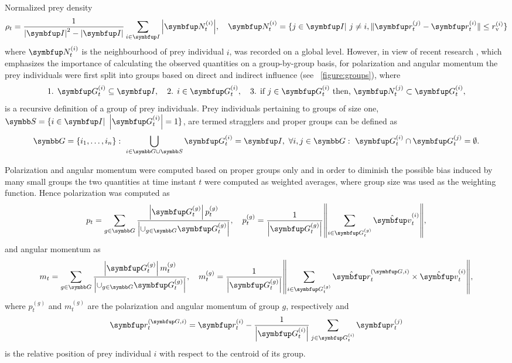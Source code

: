 Normalized prey density
%
\begin{equation}
    \rho_t = \frac{1}{\left|\set{I}\right|^2 - \left|\set{I}\right|} \sum_{i \in \set{I}}{\left|\set{N}^{(i)}_t\right|},\quad \set{N}^{(i)}_t=\{j \in \set{I}|\ j \neq i, \|\vec{r}^{(j)}_t - \vec{r}^{(i)}_t\| \leq r^{(i)}_\textnormal{v}\}
	\label{equation:density}
\end{equation}
%
where $\set{N}^{(i)}_t$ is the neighbourhood of prey individual $i$, was recorded on a global level. However, in view of recent research \cite{viscido2015using}, which emphasizes the importance of calculating the observed quantities on a group-by-group basis, for polarization and angular momentum the prey individuals were first split into groups based on direct and indirect influence (see \figurename~\ref{figure:groups})\cite{lebarbajec2007boids}, where
%
\begin{equation}
\text{1. }\set{G}^{(i)}_t \subseteq \set{I},\quad \text{2. }i \in \set{G}^{(i)}_t,\quad \text{3. if } j \in \set{G}^{(i)}_t \text{ then, } \set{N}^{(j)}_t \subset \set{G}^{(i)}_t, 
\end{equation}
%
is a recursive definition of a group of prey individuals. Prey individuals pertaining to groups of size one, $\sset{S}=\{i \in \set{I}|\ \left|\set{G}^{(i)}_t\right| = 1\}$, are termed stragglers \cite{lebarbajec2007boids} and proper groups can be defined as
%
\begin{equation}
\sset{G}=\{i_1,\ldots,i_n\}:\ \bigcup_{i \in \sset{G} \cup \sset{S}}\set{G}^{(i)}_t = \set{I},\ \forall i,j \in \sset{G}:\ \set{G}^{(i)}_t \cap \set{G}^{(j)}_t = \emptyset.
\end{equation}

Polarization and angular momentum were computed based on proper groups only and in order to diminish the possible bias induced by many small groups the two quantities at time instant $t$ were computed as weighted averages, where group size was used as the weighting function. Hence polarization was computed as
%
\begin{equation}
p_t = \sum_{g \in \sset{G}}{\frac{\left| \set{G}^{(g)}_t\right|p^{(g)}_t}{\left|\cup_{g \in \sset{G}}\set{G^{(g)}_t}\right|}},\quad p^{(g)}_t = \frac{1}{\left|\set{G^{(g)}_t}\right|}{\left\| \sum_{i \in \set{G}^{(g)}_t}{\uvec{v}^{(i)}_t} \right\|},
\label{equation:polarization}
\end{equation}
%
and angular momentum as
%
\begin{equation}
m_t = \sum_{g \in \sset{G}}{\frac{\left| \set{G}^{(g)}_t\right|m^{(g)}_t}{\left|\cup_{g \in \sset{G}}\set{G^{(g)}_t}\right|}},\quad  m^{(g)}_t = \frac{1}{\left|\set{G}^{(g)}_t\right|}{\left\| \sum_{i \in \set{G}^{(g)}_t}{\uvec{r}^{(\set{G},i)}_t \times \uvec{v}^{(i)}_t} \right\|},
\label{equation:momentum}
\end{equation}
%
where $p^{(g)}_t$ and $m^{(g)}_t$ are the polarization and angular momentum of group $g$, respectively and 
%
\begin{equation}
\vec{r}^{(\set{G},i)}_t=\vec{r}^{(i)}_t - \frac{1}{\left|\set{G}^{(i)}_t\right|}\sum_{j \in \set{G}^{(i)}_t}{\vec{r}^{(j)}_t}
\end{equation}
%
is the relative position of prey individual $i$ with respect to the centroid of its group.

